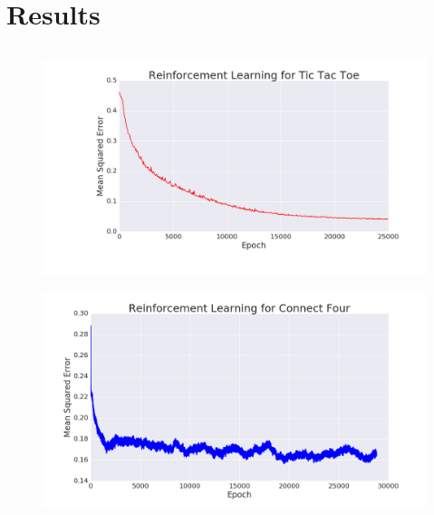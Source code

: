 \section{Results}
\subsection{}

\begin{frame}
\begin{figure}
\includegraphics[width=1 \textwidth]{reinforcement_ttt}
\end{figure}
\end{frame}

\begin{frame}
\begin{figure}
\includegraphics[width=1 \textwidth]{reinforcement_c4}
\end{figure}
\end{frame}

